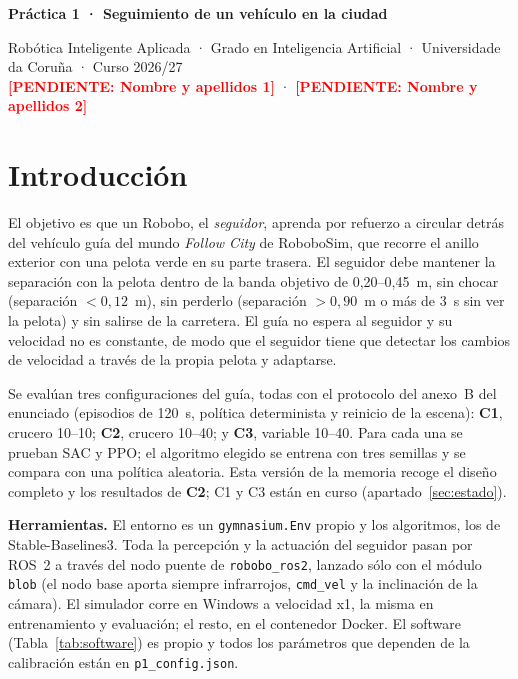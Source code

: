 \documentclass[11pt,a4paper]{article}
\newcommand{\pendiente}[1]{\textcolor{red}{\textbf{[PENDIENTE: #1]}}}
\newcommand{\cod}[1]{\texttt{\small #1}}
\begin{document}
{\Large\bfseries Práctica 1 · Seguimiento de un vehículo en la ciudad\par}
\vspace{2pt}
{\small Robótica Inteligente Aplicada · Grado en Inteligencia Artificial · Universidade da Coruña · Curso 2026/27\\
\pendiente{Nombre y apellidos 1} · \pendiente{Nombre y apellidos 2}\par}
\vspace{4pt}

\section{Introducción}

El objetivo es que un Robobo, el \emph{seguidor}, aprenda por refuerzo a circular detrás del vehículo guía del
mundo \emph{Follow City} de RoboboSim, que recorre el anillo exterior con una pelota verde en su parte trasera.
El seguidor debe mantener la separación con la pelota dentro de la banda objetivo de 0,20--0,45~m, sin chocar
(separación $<0{,}12$~m), sin perderlo (separación $>0{,}90$~m o más de 3~s sin ver la pelota) y sin salirse de
la carretera. El guía no espera al seguidor y su velocidad no es constante, de modo que el seguidor tiene que
detectar los cambios de velocidad a través de la propia pelota y adaptarse.

Se evalúan tres configuraciones del guía, todas con el protocolo del anexo~B del enunciado (episodios de 120~s,
política determinista y reinicio de la escena): \textbf{C1}, crucero 10--10; \textbf{C2}, crucero 10--40; y
\textbf{C3}, variable 10--40. Para cada una se prueban SAC y PPO; el algoritmo elegido se entrena con tres
semillas y se compara con una política aleatoria. Esta versión de la memoria recoge el diseño completo y los
resultados de \textbf{C2}; C1 y C3 están en curso (apartado~\ref{sec:estado}).

\textbf{Herramientas.} El entorno es un \cod{gymnasium.Env} propio y los algoritmos, los de Stable-Baselines3.
Toda la percepción y la actuación del seguidor pasan por ROS~2 a través del nodo puente de \cod{robobo\_ros2},
lanzado sólo con el módulo \cod{blob} (el nodo base aporta siempre infrarrojos, \cod{cmd\_vel} y la
inclinación de la cámara). El simulador corre en Windows a velocidad x1, la misma en entrenamiento y
evaluación; el resto, en el contenedor Docker. El software (Tabla~\ref{tab:software}) es propio y todos los
parámetros que dependen de la calibración están en \cod{p1\_config.json}.
\end{document}
